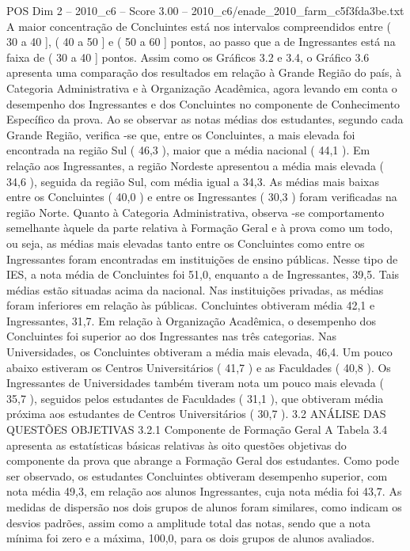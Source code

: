 \begin{textsample}{POS Dim 2 – 2010\_c6 – Score 3.00 – 2010\_c6/enade\_2010\_farm\_c5f3fda3be.txt}
A maior concentração de Concluintes está nos intervalos compreendidos entre ( 30 a 40 ], ( 40 a 50 ] e ( 50 a 60 ] pontos, ao passo que a de Ingressantes está na faixa de ( 30 a 40 ] pontos.
Assim como os Gráficos 3.2 e 3.4, o Gráfico 3.6 apresenta uma comparação dos resultados em relação à Grande Região do país, à Categoria Administrativa e à Organização Acadêmica, agora levando em conta o desempenho dos Ingressantes e dos Concluintes no componente de Conhecimento Específico da prova.
Ao se observar as notas médias dos estudantes, segundo cada Grande Região, verifica -se que, entre os Concluintes, a mais elevada foi encontrada na região Sul ( 46,3 ), maior que a média nacional ( 44,1 ).
Em relação aos Ingressantes, a região Nordeste apresentou a média mais elevada ( 34,6 ), seguida da região Sul, com média igual a 34,3.
As médias mais baixas entre os Concluintes ( 40,0 ) e entre os Ingressantes ( 30,3 ) foram verificadas na região Norte.
Quanto à Categoria Administrativa, observa -se comportamento semelhante àquele da parte relativa à Formação Geral e à prova como um todo, ou seja, as médias mais elevadas tanto entre os Concluintes como entre os Ingressantes foram encontradas em instituições de ensino públicas.
Nesse tipo de IES, a nota média de Concluintes foi 51,0, enquanto a de Ingressantes, 39,5.
Tais médias estão situadas acima da nacional.
Nas instituições privadas, as médias foram inferiores em relação às públicas.
Concluintes obtiveram média 42,1 e Ingressantes, 31,7.
Em relação à Organização Acadêmica, o desempenho dos Concluintes foi superior ao dos Ingressantes nas três categorias.
Nas Universidades, os Concluintes obtiveram a média mais elevada, 46,4.
Um pouco abaixo estiveram os Centros Universitários ( 41,7 ) e as Faculdades ( 40,8 ).
Os Ingressantes de Universidades também tiveram nota um pouco mais elevada ( 35,7 ), seguidos pelos estudantes de Faculdades ( 31,1 ), que obtiveram média próxima aos estudantes de Centros Universitários ( 30,7 ). 3.2 ANÁLISE DAS QUESTÕES OBJETIVAS 3.2.1 Componente de Formação Geral A Tabela 3.4 apresenta as estatísticas básicas relativas às oito questões objetivas do componente da prova que abrange a Formação Geral dos estudantes.
Como pode ser observado, os estudantes Concluintes obtiveram desempenho superior, com nota média 49,3, em relação aos alunos Ingressantes, cuja nota média foi 43,7.
As medidas de dispersão nos dois grupos de alunos foram similares, como indicam os desvios padrões, assim como a amplitude total das notas, sendo que a nota mínima foi zero e a máxima, 100,0, para os dois grupos de alunos avaliados.

\end{textsample}
